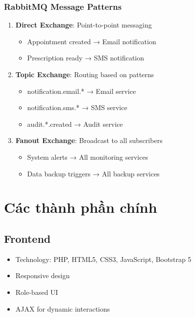 \documentclass[12pt,a4paper]{report}
\begin{document}
\subsubsection{RabbitMQ Message Patterns}
\begin{enumerate}
    \item \textbf{Direct Exchange}: Point-to-point messaging
    \begin{itemize}
        \item Appointment created → Email notification
        \item Prescription ready → SMS notification
    \end{itemize}
    
    \item \textbf{Topic Exchange}: Routing based on patterns
    \begin{itemize}
        \item notification.email.* → Email service
        \item notification.sms.* → SMS service
        \item audit.*.created → Audit service
    \end{itemize}
    
    \item \textbf{Fanout Exchange}: Broadcast to all subscribers
    \begin{itemize}
        \item System alerts → All monitoring services
        \item Data backup triggers → All backup services
    \end{itemize}
\end{enumerate}

\section{Các thành phần chính}

\subsection{Frontend}
\begin{itemize}
    \item Technology: PHP, HTML5, CSS3, JavaScript, Bootstrap 5
    \item Responsive design
    \item Role-based UI
    \item AJAX for dynamic interactions
\end{itemize}
\end{document}
